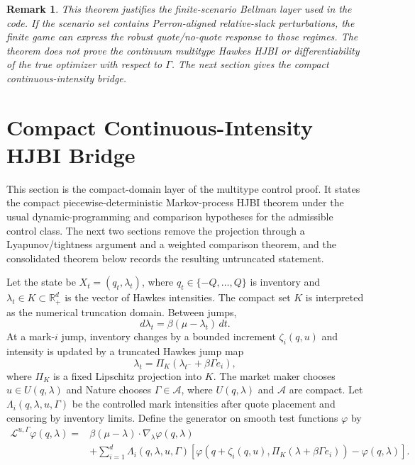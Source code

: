 \documentclass[11pt]{article}
\newtheorem{remark}{Remark}
\newcommand{\R}{\mathbb{R}}
\begin{document}
\begin{remark}
This theorem justifies the finite-scenario Bellman layer used in the code. If
the scenario set contains Perron-aligned relative-slack perturbations, the
finite game can express the robust quote/no-quote response to those regimes.
The theorem does not prove the continuum multitype Hawkes HJBI or
differentiability of the true optimizer with respect to $\Gamma$. The next
section gives the compact continuous-intensity bridge.
\end{remark}

\section{Compact Continuous-Intensity HJBI Bridge}

This section is the compact-domain layer of the multitype control proof. It
states the compact piecewise-deterministic Markov-process HJBI theorem under
the usual dynamic-programming and comparison hypotheses for the admissible
control class. The next two sections remove the projection through a
Lyapunov/tightness argument and a weighted comparison theorem, and the
consolidated theorem below records the resulting untruncated statement.

Let the state be $X_t=(q_t,\lambda_t)$, where
$q_t\in\{-Q,\ldots,Q\}$ is inventory and
$\lambda_t\in K\subset\R_+^d$ is the vector of Hawkes intensities. The compact
set $K$ is interpreted as the numerical truncation domain. Between jumps,
\[
d\lambda_t=\beta(\mu-\lambda_t)\,dt.
\]
At a mark-$i$ jump, inventory changes by a bounded increment $\zeta_i(q,u)$
and intensity is updated by a truncated Hawkes jump map
\[
\lambda_{t}=\Pi_K\left(\lambda_{t^-}+\beta\Gamma e_i\right),
\]
where $\Pi_K$ is a fixed Lipschitz projection into $K$. The market maker chooses
$u\in U(q,\lambda)$ and Nature chooses
$\Gamma\in\mathcal A$, where $U(q,\lambda)$ and $\mathcal A$ are compact. Let
$\Lambda_i(q,\lambda,u,\Gamma)$ be the controlled mark intensities after quote
placement and censoring by inventory limits. Define the generator on smooth
test functions $\varphi$ by
\[
\begin{aligned}
\mathcal L^{u,\Gamma}\varphi(q,\lambda)
={}&\beta(\mu-\lambda)\cdot\nabla_\lambda\varphi(q,\lambda)\\
&+\sum_{i=1}^d \Lambda_i(q,\lambda,u,\Gamma)
\left[
\varphi(q+\zeta_i(q,u),\Pi_K(\lambda+\beta\Gamma e_i))
-\varphi(q,\lambda)
\right].
\end{aligned}
\]
\end{document}

